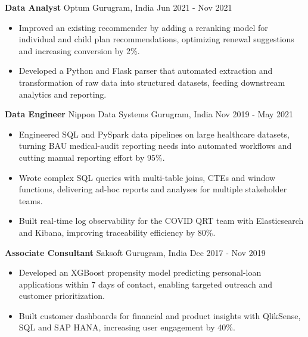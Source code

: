\documentclass[10pt,a4paper]{article}
\newcommand{\role}[4]{\textbf{#1} \textbar{} #2 \hfill #3 \textbar{} #4\par}
\begin{document}
\vspace{3pt}
\role{Data Analyst}{Optum}{Gurugram, India}{Jun 2021 - Nov 2021}
\begin{itemize}
  \item Improved an existing recommender by adding a reranking model for individual and child plan recommendations, optimizing renewal suggestions and increasing conversion by 2\%.
  \item Developed a Python and Flask parser that automated extraction and transformation of raw data into structured datasets, feeding downstream analytics and reporting.
\end{itemize}
\vspace{3pt}
\role{Data Engineer}{Nippon Data Systems}{Gurugram, India}{Nov 2019 - May 2021}
\begin{itemize}
  \item Engineered SQL and PySpark data pipelines on large healthcare datasets, turning BAU medical-audit reporting needs into automated workflows and cutting manual reporting effort by 95\%.
  \item Wrote complex SQL queries with multi-table joins, CTEs and window functions, delivering ad-hoc reports and analyses for multiple stakeholder teams.
  \item Built real-time log observability for the COVID QRT team with Elasticsearch and Kibana, improving traceability efficiency by 80\%.
\end{itemize}
\vspace{3pt}
\role{Associate Consultant}{Saksoft}{Gurugram, India}{Dec 2017 - Nov 2019}
\begin{itemize}
  \item Developed an XGBoost propensity model predicting personal-loan applications within 7 days of contact, enabling targeted outreach and customer prioritization.
  \item Built customer dashboards for financial and product insights with QlikSense, SQL and SAP HANA, increasing user engagement by 40\%.
\end{itemize}
\end{document}
